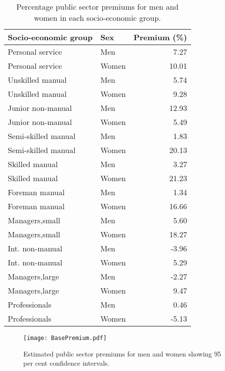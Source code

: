 \documentclass[a4paper,11pt,titlepage]{article}
\begin{document}
\begin{table}[ht]
    \caption{Percentage public sector premiums for men and women in each socio-economic group. \label{tab:fullprem}}
    \begin{center}
    \begin{tabular}{llr}
      \toprule
     Socio-economic group & Sex & Premium (\%) \\
      \midrule
    Personal service & Men & 7.27 \\
    Personal service & Women & 10.01 \\
    Unskilled manual & Men & 5.74 \\
    Unskilled manual & Women & 9.28 \\
    Junior non-manual & Men & 12.93 \\
    Junior non-manual & Women & 5.49 \\
    Semi-skilled manual& Men & 1.83 \\
    Semi-skilled manual & Women & 20.13 \\
    Skilled manual & Men & 3.27 \\
    Skilled manual & Women & 21.23 \\
    Foreman manual & Men & 1.34 \\
    Foreman manual & Women & 16.66 \\
    Managers,small & Men & 5.60 \\
    Managers,small & Women & 18.27 \\
    Int. non-manual& Men & -3.96 \\
    Int. non-manual& Women & 5.29 \\
    Managers,large & Men & -2.27 \\
    Managers,large & Women & 9.47 \\
    Professionals & Men & 0.46 \\
    Professionals & Women & -5.13 \\
       \bottomrule
    \end{tabular}
    \end{center}
\end{table}

\begin{figure}
    \texttt{[image: BasePremium.pdf]}
    \caption{Estimated public sector premiums for men and women showing 95 per cent
    confidence intervals.\label{fig:base}}
\end{figure}
\end{document}
